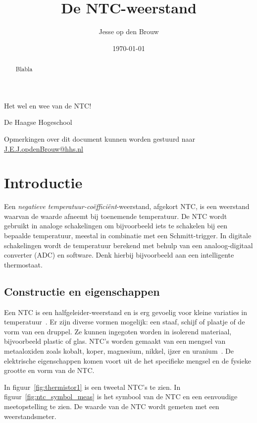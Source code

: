 \documentclass[12pt,a4paper,final,twoside,fleqn]{article}
\author{Jesse op den Brouw}
\title{De NTC-weerstand}
\date{\today}
\makeatletter
\def\maketitle{%
  \null
  \thispagestyle{empty}%
  \vskip 3cm
  \begin{center}\leavevmode
    {\LARGE \@title\par}%
    {\large \subtitle\par}%
    \vskip 1cm
    {\large \@author\par}%
    \vskip 0.03cm
    {\large De Haagse Hogeschool\par}%
    \vskip 0.03cm
    {\large \@date\par}%
  \end{center}%
  \vfill
  \null
}
\newcommand{\subtitle}{Het wel en wee van de NTC!}
\makeatother
\begin{document}
\raggedbottom

\maketitle
\begin{abstract}
\noindent
Blabla
\end{abstract}
\vspace*{2cm}

\clearpage
\tableofcontents
\clearpage
\listoffigures
\vspace{1cm}
\lstlistoflistings
\vfill
{\small
Opmerkingen over dit document kunnen worden gestuurd naar
\href{mailto:J.E.J.opdenBrouw@hhs.nl}{J.E.J.opdenBrouw@hhs.nl}
}
\clearpage


\section{Introductie}
Een \textsl{negatieve temperatuur-co\"effici\"ent}-weerstand, afgekort NTC,
is een weerstand waarvan de waarde afneemt bij toenemende temperatuur. De
NTC wordt gebruikt in analoge schakelingen om bijvoorbeeld iets te schakelen
bij een bepaalde temperatuur, meestal in combinatie met een Schmitt-trigger.
In digitale schakelingen wordt de temperatuur berekend met behulp van een
analoog-digitaal converter (ADC) en software. Denk hierbij bijvoorbeeld aan
een intelligente thermostaat. 

\subsection{Constructie en eigenschappen}
Een NTC is een halfgeleider-weerstand en is erg gevoelig voor kleine variaties
in temperatuur~\cite{jespersen1982thermal}. Er zijn diverse vormen mogelijk:
een staaf, schijf of plaatje of de vorm van een druppel. Ze kunnen ingegoten
worden in isolerend materiaal, bijvoorbeeld plastic of glas.
NTC's worden gemaakt van een mengsel van metaaloxiden zoals kobalt, koper,
magnesium, nikkel, ijzer en uranium~\cite{bakshi2009basic}. De elektrische
eigenschappen komen voort uit de het specifieke mengsel en de fysieke grootte
en vorm van de NTC.

In figuur~\ref{fig:thermistor1} is een tweetal NTC's te zien.
In figuur~\ref{fig:ntc_symbol_meas} is het symbool van de NTC en een eenvoudige
meetopstelling te zien. De waarde van de NTC wordt gemeten met een weerstandsmeter.
\end{document}
